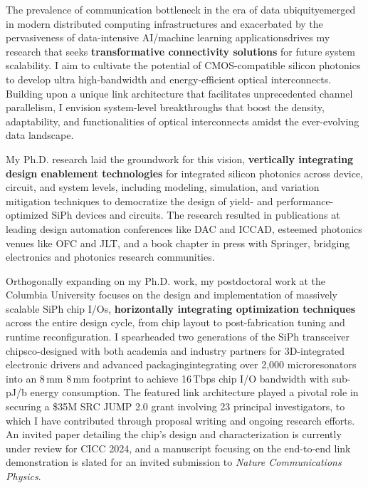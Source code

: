 The prevalence of communication bottleneck in the era of data ubiquity\textemdash emerged in modern distributed computing infrastructures and exacerbated by the pervasiveness of data-intensive AI/machine learning applications\textemdash drives my research that seeks \textbf{transformative connectivity solutions} for future system scalability. I aim to cultivate the potential of CMOS-compatible silicon photonics to develop ultra high-bandwidth and energy-efficient optical interconnects. Building upon a unique link architecture that facilitates unprecedented channel parallelism, I envision system-level breakthroughs that boost the density, adaptability, and functionalities of optical interconnects amidst the ever-evolving data landscape.

My Ph.D. research laid the groundwork for this vision, \textbf{vertically integrating design enablement technologies} for integrated silicon photonics across device, circuit, and system levels, including modeling, simulation, and variation mitigation techniques to democratize the design of yield- and performance-optimized SiPh devices and circuits. The research resulted in publications at leading design automation conferences like DAC and ICCAD, esteemed photonics venues like OFC and JLT, and a book chapter in press with Springer, bridging electronics and photonics research communities.

Orthogonally expanding on my Ph.D. work, my postdoctoral work at the Columbia University focuses on the design and implementation of massively scalable SiPh chip I/Os, \textbf{horizontally integrating optimization techniques} across the entire design cycle, from chip layout to post-fabrication tuning and runtime reconfiguration. I spearheaded two generations of the SiPh transceiver chips\textemdash co-designed with both academia and industry partners for 3D-integrated electronic drivers and advanced packaging\textemdash integrating over 2,000 microresonators into an 8\,mm \texttimes{} 8\,mm footprint to achieve 16\,Tbps chip I/O bandwidth with sub-pJ/b energy consumption. The featured link architecture played a pivotal role in securing a \$35M SRC JUMP 2.0 grant involving 23 principal investigators, to which I have contributed through proposal writing and ongoing research efforts. An invited paper detailing the chip's design and characterization is currently under review for CICC 2024, and a manuscript focusing on the end-to-end link demonstration is slated for an invited submission to \emph{Nature Communications Physics}.

